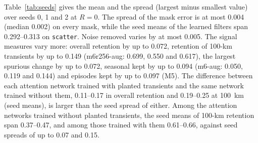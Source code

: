 \documentclass[preprint,12pt,authoryear]{elsarticle}
\begin{document}
Table~\ref{tab:seeds} gives the mean and the spread (largest minus smallest value) over seeds 0, 1 and 2 at $R = 0$. The spread of the mask error is at most 0.004 (median 0.002) on every mask, while the seed means of the learned filters span 0.292--0.313 on \texttt{scatter}. Noise removed varies by at most 0.005. The signal measures vary more: overall retention by up to 0.072, retention of 100-km transients by up to 0.149 (m6r256-aug: 0.699, 0.550 and 0.617), the largest spurious change by up to 0.072, seasonal kept by up to 0.094 (m6-aug: 0.050, 0.119 and 0.144) and episodes kept by up to 0.097 (M5). The difference between each attention network trained with planted transients and the same network trained without them, 0.11--0.17 in overall retention and 0.19--0.25 at 100~km (seed means), is larger than the seed spread of either. Among the attention networks trained without planted transients, the seed means of 100-km retention span 0.37--0.47, and among those trained with them 0.61--0.66, against seed spreads of up to 0.07 and 0.15.
\end{document}
